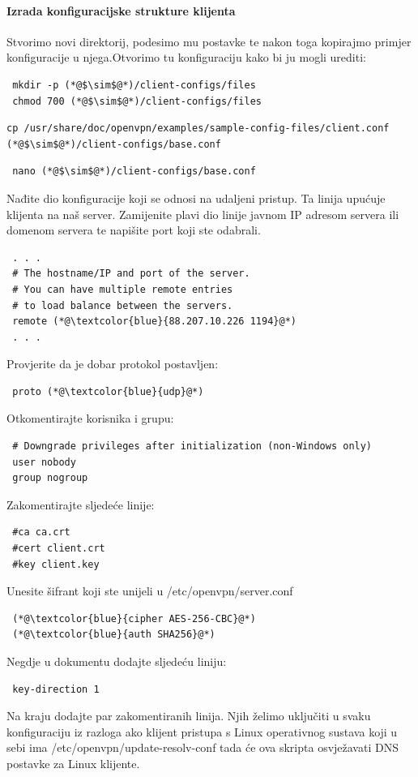 \paragraph*{Izrada konfiguracijske strukture klijenta}
\hfill \smallbreak
Stvorimo novi direktorij, podesimo mu postavke te nakon toga kopirajmo primjer konfiguracije u njega.Otvorimo tu konfiguraciju kako bi ju mogli urediti:
\begin{lstlisting}
 mkdir -p (*@$\sim$@*)/client-configs/files
 chmod 700 (*@$\sim$@*)/client-configs/files
\end{lstlisting}
\begin{lstlisting}[basicstyle=\tiny]
 cp /usr/share/doc/openvpn/examples/sample-config-files/client.conf (*@$\sim$@*)/client-configs/base.conf
\end{lstlisting}
\begin{lstlisting}
 nano (*@$\sim$@*)/client-configs/base.conf
\end{lstlisting}
Nađite dio konfiguracije koji se odnosi na udaljeni pristup. Ta linija upućuje klijenta na naš server. Zamijenite plavi dio linije javnom IP adresom servera ili domenom servera te napišite port koji ste odabrali.
\begin{lstlisting}
 . . .
 # The hostname/IP and port of the server.
 # You can have multiple remote entries
 # to load balance between the servers.
 remote (*@\textcolor{blue}{88.207.10.226 1194}@*)
 . . .
\end{lstlisting}
Provjerite da je dobar protokol postavljen:
\begin{lstlisting}
 proto (*@\textcolor{blue}{udp}@*)
\end{lstlisting}
Otkomentirajte korisnika i grupu:
\begin{lstlisting}
 # Downgrade privileges after initialization (non-Windows only)
 user nobody
 group nogroup
\end{lstlisting}
Zakomentirajte sljedeće linije:
\begin{lstlisting}
 #ca ca.crt
 #cert client.crt
 #key client.key
\end{lstlisting}
Unesite šifrant koji ste unijeli u /etc/openvpn/server.conf
\begin{lstlisting}
 (*@\textcolor{blue}{cipher AES-256-CBC}@*)
 (*@\textcolor{blue}{auth SHA256}@*)
\end{lstlisting}
Negdje u dokumentu dodajte sljedeću liniju:
\begin{lstlisting}
 key-direction 1
\end{lstlisting}
Na kraju dodajte par zakomentiranih linija. Njih želimo uključiti u svaku konfiguraciju iz razloga ako klijent pristupa s Linux operativnog sustava koji u sebi ima /etc/openvpn/update-resolv-conf tada će ova skripta osvježavati DNS postavke za Linux klijente.
